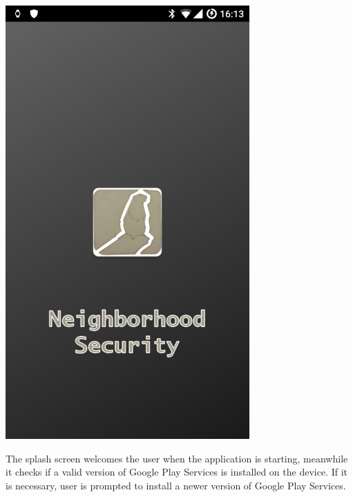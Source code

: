 \documentclass[a4paper]{scrreprt}
\begin{document}
\begin{minipage}{0.5\textwidth}
	\centering
	\includegraphics[width=0.7\textwidth]{imgs/splash}
\end{minipage}
\begin{minipage}{0.5\textwidth}
	The splash screen welcomes the user when the application is starting, meanwhile it checks if a valid version of Google Play Services is installed on the device. If it is necessary, user is prompted to install a newer version of Google Play Services.
\end{minipage}
\end{document}

